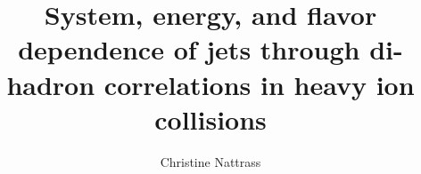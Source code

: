 \documentclass[12pt]{report}
\begin{document}
\title{System, energy, and flavor dependence of jets through di-hadron correlations in heavy ion collisions}

\author{Christine Nattrass}
 
 \copyrighttrue


%
\beforepreface

%
\afterpreface
\clearpage {}
\newpage




% 
% 








% 
 \appendix


%



% 
% 
% 
% 
% 
% 
% 
% 
% 
% 
% 
%  
%
% 
% 
%
 
 
  \printindex
\end{document}
